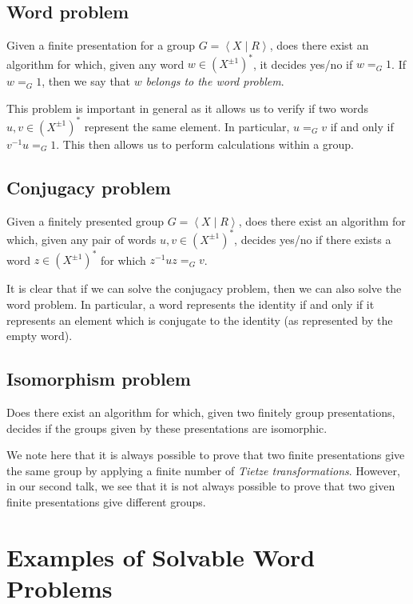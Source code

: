 \documentclass[11pt,a4paper,reqno]{amsart}
\theoremstyle{plain}
\theoremstyle{definition}
\theoremstyle{definition}
\begin{document}
\subsection{Word problem}

Given a finite presentation for a group $G = \left\langle X \mid R \right\rangle$, does there exist an algorithm for which, given any word $w\in (X^{\pm 1})^*$, it decides yes/no if $w =_G 1$.
If $w=_G 1$, then we say that $w$ \emph{belongs to the word problem}.

This problem is important in general as it allows us to verify if two words $u,v \in (X^{\pm 1})^*$ represent the same element.
In particular, $u =_G v$ if and only if $v^{-1}u =_G 1$.
This then allows us to perform calculations within a group.


\subsection{Conjugacy problem}

Given a finitely presented group $G = \left\langle X \mid R\right\rangle$, does there exist an algorithm for which, given any pair of words $u,v \in (X^{\pm 1})^*$, decides yes/no if there exists a word $z \in (X^{\pm 1})^*$ for which $z^{-1} u z =_G v$.

It is clear that if we can solve the conjugacy problem, then we can also solve the word problem.
In particular, a word represents the identity if and only if it represents an element which is conjugate to the identity (as represented by the empty word).

\subsection{Isomorphism problem}

Does there exist an algorithm for which, given two finitely group presentations, decides if the groups given by these presentations are isomorphic.

We note here that it is always possible to prove that two finite presentations give the same group by applying a finite number of \textit{Tietze transformations}.
However, in our second talk, we see that it is not always possible to prove that two given finite presentations give different groups.

\section{Examples of Solvable Word Problems}
\end{document}
